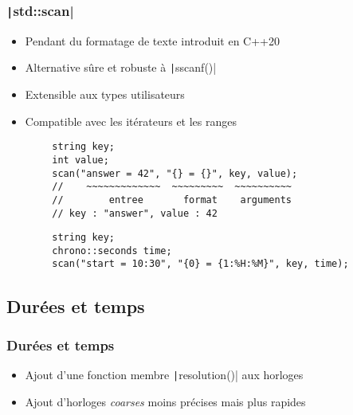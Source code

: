 \documentclass[C++.tex]{subfiles}
\begin{document}
\begin{frame}[fragile]
	\frametitle{\texttt|std::scan|}
	\begin{itemize}
		\item Pendant du formatage de texte introduit en C++20
		\item Alternative sûre et robuste à \texttt|sscanf()|
		\item Extensible aux types utilisateurs
		\item Compatible avec les itérateurs et les ranges
	\end{itemize}

	\begin{verbatim}
		string key;
		int value;
		scan("answer = 42", "{} = {}", key, value);
		//    ~~~~~~~~~~~~~  ~~~~~~~~~  ~~~~~~~~~~
		//        entree       format    arguments
		// key : "answer", value : 42
	\end{verbatim}

	\begin{verbatim}
		string key;
		chrono::seconds time;
		scan("start = 10:30", "{0} = {1:%H:%M}", key, time);
	\end{verbatim}
\end{frame}

\subsection*{Durées et temps}
\begin{frame}[fragile]
	\frametitle{Durées et temps}
	\begin{itemize}
		\item Ajout d'une fonction membre \texttt|resolution()| aux horloges
		\item Ajout d'horloges \textit{coarses} moins précises mais plus rapides
	\end{itemize}

\end{frame}
\end{document}

